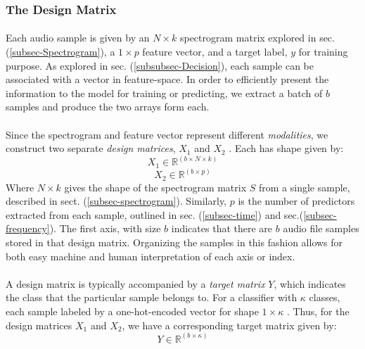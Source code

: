 \documentclass[12pt,letterpaper]{article}
\begin{document}

\subsubsection{The Design Matrix}
\label{subsubsec-DesignMatrix}

\paragraph*{}Each audio sample is given by an $N \times k$ spectrogram matrix explored in sec. (\ref{subsec-Spectrogram}), a $1 \times p$ feature vector, and a target label, $y$ for training purpose. As explored in sec. (\ref{subsubsec-Decision}), each sample can be associated with a vector in feature-space. In order to efficiently present the information to the model for training or predicting, we extract a batch of $b$ samples and produce the two arrays form each.

\paragraph*{}Since the spectrogram and feature vector represent different \textit{modalities}, we construct two separate \textit{design matrices}, $X_1$ and $X_2$ \cite{Geron,Li,Ngiam}. Each has shape given by:
\begin{equation}
\label{eqn-X1Shape}
X_1 \in \mathbb{R}^{(b \times N \times k)}
\end{equation}
\begin{equation}
\label{eqn-X2Shape}
X_2 \in \mathbb{R}^{(b \times p)}
\end{equation}
Where $N \times k$ gives the shape of the spectrogram matrix $S$ from a single sample, described in sect. (\ref{subsec-spectrogram}). Similarly, $p$ is the number of predictors extracted from each sample, outlined in sec. (\ref{subsec-time}) and sec.(\ref{subsec-frequency}). The first axis, with size $b$ indicates that there are $b$ audio file samples stored in that design matrix. Organizing the samples in this fashion allows for both easy machine and human interpretation of each axis or index.

\paragraph*{}A design matrix is typically accompanied by a \textit{target matrix} $Y$, which indicates the class that the particular sample belongs to. For a classifier with $\kappa$ classes, each sample labeled by a one-hot-encoded vector for shape $1 \times \kappa$ \cite{Tensorflow,Loy}. Thus, for the design matrices $X_1$ and $X_2$, we have a corresponding target matrix given by:
\begin{equation}
\label{eqn-YShape}
Y \in \mathbb{R}^{(b \times \kappa)}
\end{equation}
\end{document}
